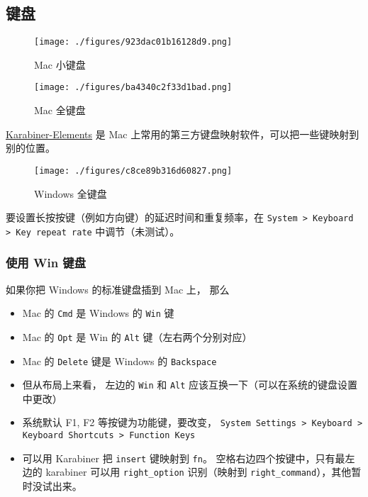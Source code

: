 
\subsection{键盘}

\begin{figure}[ht]
\centering
\texttt{[image: ./figures/923dac01b16128d9.png]}
\caption{Mac 小键盘} \label{fig_MacNt_5}
\end{figure}

\begin{figure}[ht]
\centering
\texttt{[image: ./figures/ba4340c2f33d1bad.png]}
\caption{Mac 全键盘} \label{fig_MacNt_4}
\end{figure}

\href{https://karabiner-elements.pqrs.org/}{Karabiner-Elements} 是 Mac 上常用的第三方键盘映射软件，可以把一些键映射到别的位置。

\begin{figure}[ht]
\centering
\texttt{[image: ./figures/c8ce89b316d60827.png]}
\caption{Windows 全键盘} \label{fig_MacNt_3}
\end{figure}

要设置长按按键（例如方向键）的延迟时间和重复频率，在 \verb`System > Keyboard > Key repeat rate` 中调节（未测试）。

\subsubsection{使用 Win 键盘}
如果你把 Windows 的标准键盘插到 Mac 上， 那么
\begin{itemize}
\item Mac 的 \verb|Cmd| 是 Windows 的 \verb|Win| 键
\item Mac 的 \verb|Opt| 是 Win 的 \verb|Alt| 键（左右两个分别对应）
\item Mac 的 \verb|Delete| 键是 Windows 的 \verb|Backspace|
\item 但从布局上来看， 左边的 \verb|Win| 和 \verb|Alt| 应该互换一下（可以在系统的键盘设置中更改）
\item 系统默认 F1, F2 等按键为功能键，要改变， \verb`System Settings > Keyboard > Keyboard Shortcuts > Function Keys`
\item 可以用 Karabiner 把 \verb`insert` 键映射到 \verb`fn`。 空格右边四个按键中，只有最左边的 karabiner 可以用 \verb`right_option` 识别（映射到 \verb`right_command`），其他暂时没试出来。
\end{itemize}

